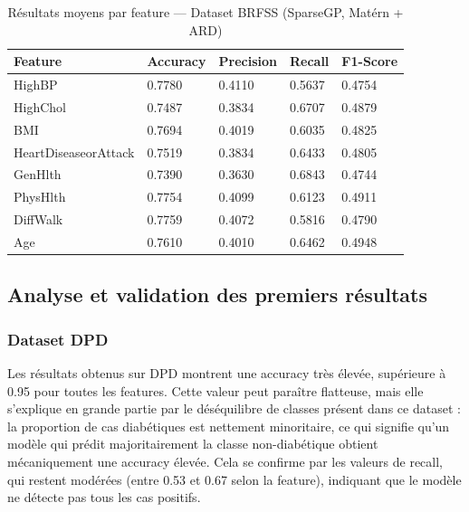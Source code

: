 \documentclass[12pt,a4paper]{article}
\begin{document}
\begin{table}[H]
\centering
\caption{Résultats moyens par feature — Dataset BRFSS (SparseGP, Matérn + ARD)}
\label{tab:brfss_results}
\small
\begin{tabular}{p{3.5cm}p{2.5cm}p{2.5cm}p{2.5cm}p{2.5cm}}
\hline
\textbf{Feature} & \textbf{Accuracy} & \textbf{Precision} & \textbf{Recall} & \textbf{F1-Score} \\
\hline
HighBP                & 0.7780 & 0.4110 & 0.5637 & 0.4754 \\
HighChol              & 0.7487 & 0.3834 & 0.6707 & 0.4879 \\
BMI                   & 0.7694 & 0.4019 & 0.6035 & 0.4825 \\
HeartDiseaseorAttack  & 0.7519 & 0.3834 & 0.6433 & 0.4805 \\
GenHlth               & 0.7390 & 0.3630 & 0.6843 & 0.4744 \\
PhysHlth              & 0.7754 & 0.4099 & 0.6123 & 0.4911 \\
DiffWalk              & 0.7759 & 0.4072 & 0.5816 & 0.4790 \\
Age                   & 0.7610 & 0.4010 & 0.6462 & 0.4948 \\
\hline
\end{tabular}
\end{table}


\subsection{Analyse et validation des premiers résultats}

\subsubsection*{Dataset DPD}

Les résultats obtenus sur DPD montrent une accuracy très élevée, supérieure à 0.95 pour toutes les features. Cette valeur peut paraître flatteuse, mais elle s'explique en grande partie par le déséquilibre de classes présent dans ce dataset : la proportion de cas diabétiques est nettement minoritaire, ce qui signifie qu'un modèle qui prédit majoritairement la classe non-diabétique obtient mécaniquement une accuracy élevée. Cela se confirme par les valeurs de recall, qui restent modérées (entre 0.53 et 0.67 selon la feature), indiquant que le modèle ne détecte pas tous les cas positifs.
\end{document}
